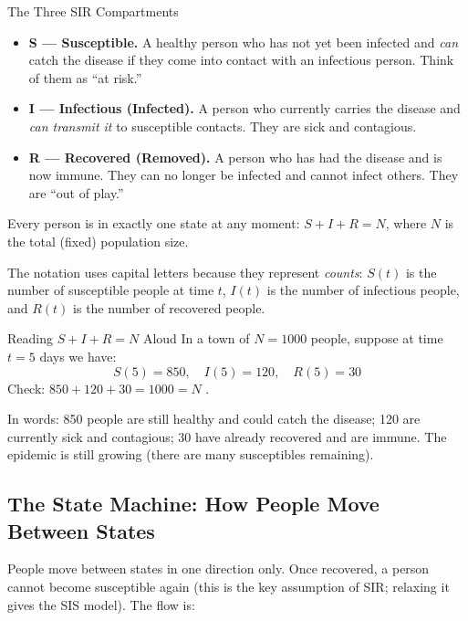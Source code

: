 \begin{conceptbox}{The Three SIR Compartments}
\begin{itemize}[noitemsep]
    \item \textbf{S --- Susceptible.} A healthy person who has not yet been infected and \emph{can} catch the disease if they come into contact with an infectious person. Think of them as ``at risk.''
    \item \textbf{I --- Infectious (Infected).} A person who currently carries the disease and \emph{can transmit it} to susceptible contacts. They are sick and contagious.
    \item \textbf{R --- Recovered (Removed).} A person who has had the disease and is now immune. They can no longer be infected and cannot infect others. They are ``out of play.''
\end{itemize}

Every person is in exactly one state at any moment: $S + I + R = N$, where $N$ is the total (fixed) population size.
\end{conceptbox}

The notation uses capital letters because they represent \emph{counts}: $S(t)$ is the number of susceptible people at time $t$, $I(t)$ is the number of infectious people, and $R(t)$ is the number of recovered people.

\begin{examplebox}{Reading $S + I + R = N$ Aloud}
In a town of $N = 1000$ people, suppose at time $t = 5$ days we have:
\[
S(5) = 850, \quad I(5) = 120, \quad R(5) = 30
\]
Check: $850 + 120 + 30 = 1000 = N$ \checkmark.

In words: 850 people are still healthy and could catch the disease; 120 are currently sick and contagious; 30 have already recovered and are immune. The epidemic is still growing (there are many susceptibles remaining).
\end{examplebox}

\subsection{The State Machine: How People Move Between States}

People move between states in one direction only. Once recovered, a person cannot become susceptible again (this is the key assumption of SIR; relaxing it gives the SIS model). The flow is:


